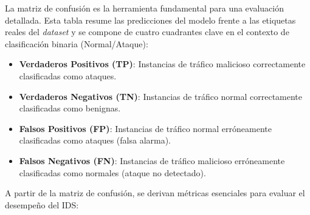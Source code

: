 La matriz de confusión es la herramienta fundamental para una evaluación detallada. Esta tabla resume las predicciones del modelo frente a las etiquetas reales del \textit{dataset} y se compone de cuatro cuadrantes clave en el contexto de clasificación binaria (Normal/Ataque):

\begin{itemize}

    \item\textbf{Verdaderos Positivos (TP)}: Instancias de tráfico malicioso correctamente clasificadas como ataques.
    
    \item\textbf{Verdaderos Negativos (TN)}: Instancias de tráfico normal correctamente clasificadas como benignas.
    
    \item\textbf{Falsos Positivos (FP)}: Instancias de tráfico normal erróneamente clasificadas como ataques (falsa alarma).
    
    \item\textbf{Falsos Negativos (FN)}: Instancias de tráfico malicioso erróneamente clasificadas como normales (ataque no detectado).

\end{itemize}

A partir de la matriz de confusión, se derivan métricas esenciales para evaluar el desempeño del IDS:

